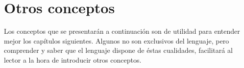 \section{Otros conceptos}

Los conceptos que se presentarán a continuación son de utilidad para entender mejor los capítulos siguientes. Algunos no son exclusivos del lenguaje, pero comprender y saber que el lenguaje dispone de éstas cualidades, facilitará al lector a la hora de introducir otros conceptos.




